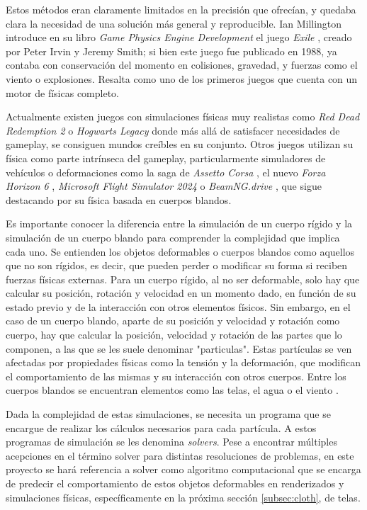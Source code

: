 Estos métodos eran claramente limitados en la precisión que ofrecían, y quedaba clara la necesidad de una solución más general y reproducible. Ian Millington introduce en su libro \textit{Game Physics Engine Development} \cite{millington2007game} el juego \textit{Exile} \cite{exile1988}, creado por Peter Irvin y Jeremy Smith; si bien este juego fue publicado en 1988, ya contaba con conservación del momento en colisiones, gravedad, y fuerzas como el viento o explosiones. Resalta como uno de los primeros juegos que cuenta con un motor de físicas completo. \newline

Actualmente existen juegos con simulaciones físicas muy realistas como \textit{Red Dead Redemption 2} \cite{rdr2} o \textit{Hogwarts Legacy} \cite{hogwarts} donde más allá de satisfacer necesidades de gameplay, se consiguen mundos creíbles en su conjunto. Otros juegos utilizan su física como parte intrínseca del gameplay, particularmente simuladores de vehículos o deformaciones como la saga de \textit{Assetto Corsa} \cite{assettocorsa}, el nuevo \textit{Forza Horizon 6} \cite{forza6}, \textit{Microsoft Flight Simulator 2024} \cite{msfs2024} o \textit{BeamNG.drive} \cite{beamng}, que sigue destacando por su física basada en cuerpos blandos. \newline

Es importante conocer la diferencia entre la simulación de un cuerpo rígido y la simulación de un cuerpo blando para comprender la complejidad que implica cada uno. Se entienden los objetos deformables o cuerpos blandos como aquellos que no son rígidos, es decir, que pueden perder o modificar su forma si reciben fuerzas físicas externas. Para un cuerpo rígido, al no ser deformable, solo hay que calcular su posición, rotación y velocidad en un momento dado, en función de su estado previo y de la interacción con otros elementos físicos. Sin embargo, en el caso de un cuerpo blando, aparte de su posición y velocidad y rotación como cuerpo, hay que calcular la posición, velocidad y rotación de las partes que lo componen, a las que se les suele denominar "particulas". Estas partículas se ven afectadas por propiedades físicas como la tensión y la deformación, que modifican el comportamiento de las mismas y su interacción con otros cuerpos. Entre los cuerpos blandos se encuentran elementos como las telas, el agua o el viento \cite{erlebenbook}. \newline

Dada la complejidad de estas simulaciones, se necesita un programa que se encargue de realizar los cálculos necesarios para cada partícula. A estos programas de simulación se les denomina \textit{solvers}. Pese a encontrar múltiples acepciones en el término solver para distintas resoluciones de problemas, en este proyecto se hará referencia a solver como algoritmo computacional que se encarga de predecir el comportamiento de estos objetos deformables en renderizados y simulaciones físicas, específicamente en la próxima sección \ref{subsec:cloth}, de telas. \newline

